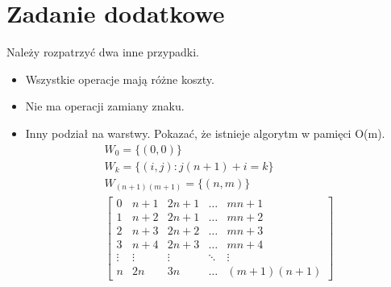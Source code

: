 \documentclass[paper=a4, fontsize=11pt]{article}
\begin{document}
\section{Zadanie dodatkowe}
Należy rozpatrzyć dwa inne przypadki.
\begin{itemize}
\item Wszystkie operacje mają różne koszty.
\item Nie ma operacji zamiany znaku.
\item Inny podział na warstwy. Pokazać, że istnieje algorytm w pamięci O(m).
\begin{gather*}
W_0 = \{(0,0) \} \\
W_k = \{(i,j) : j(n+1) + i = k\} \\
W_{(n+1)(m+1)} = \{(n, m) \} \\
\begin{bmatrix}
0 & n + 1 & 2n + 1 & \dots & mn + 1 \\
1 & n + 2 & 2n + 1 & \dots & mn + 2 \\
2 & n + 3 & 2n + 2 & \dots & mn + 3 \\
3 & n + 4 & 2n + 3 & \dots & mn + 4\\
\vdots & \vdots & \vdots & \ddots & \vdots \\
n & 2n & 3n & \dots & (m+1)(n+1)
\end{bmatrix}
\end{gather*}
\end{itemize}
\end{document}
